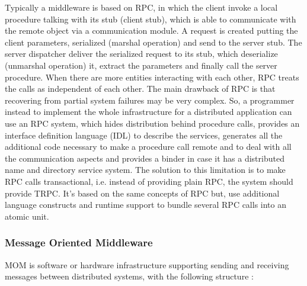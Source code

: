Typically a middleware is based on RPC, in which the client invoke a local procedure talking with its stub (client stub), which is able to communicate with the remote object via a communication module. A request is created putting the client parameters, serialized (marshal operation) and send to the server stub. The server dispatcher deliver the serialized request to its stub, which deserialize (unmarshal operation) it, extract the parameters and finally call the server procedure. When there are more entities interacting with each other, RPC treats the calls as independent of each other. The main drawback of RPC is that recovering from partial system failures may be very complex. So, a programmer instead to implement the whole infrastructure for a distributed application can use an RPC system, which hides distribution behind procedure calls, provides an interface definition language (IDL) to describe the services, generates all the additional code necessary to make a procedure call remote and to deal with all the communication aspects and provides a binder in case it has a distributed name and directory service system. The solution to this limitation is to make RPC calls transactional, i.e. instead of providing plain RPC, the system should provide TRPC. It's based on the same concepts of RPC but, use additional language constructs and runtime support to bundle several RPC calls into an atomic unit.
\subsubsection{Message Oriented Middleware}
MOM is software or hardware infrastructure supporting sending and receiving messages between distributed systems, with the following structure :

